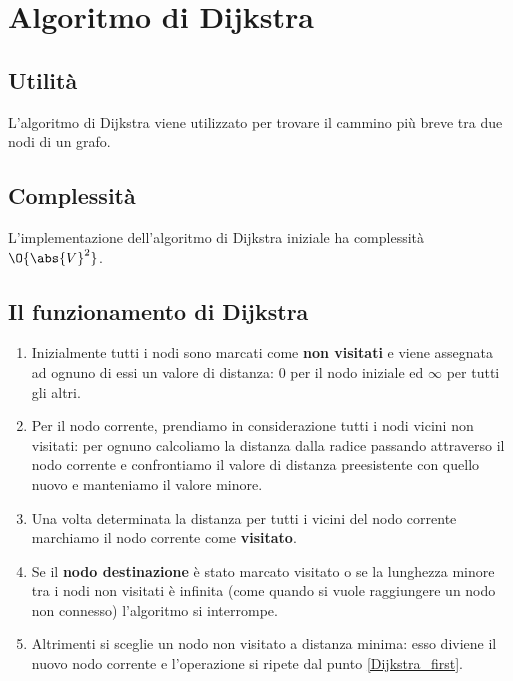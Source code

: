 \documentclass[\main/main.tex]{subfiles}
\begin{document}
\chapter{Algoritmo di Dijkstra}
\section{Utilità}
L'algoritmo di Dijkstra viene utilizzato per trovare il cammino più breve tra due nodi di un grafo.
\section{Complessità}
\begin{complexity}
  L'implementazione dell'algoritmo di Dijkstra iniziale ha complessità \(\O{\abs{V}^2}\).
\end{complexity}

\section{Il funzionamento di Dijkstra}
\begin{enumerate}
  \item Inizialmente tutti i nodi sono marcati come \textbf{non visitati} e viene assegnata ad ognuno di essi un valore di distanza: \(0\) per il nodo iniziale ed \(\infty \) per tutti gli altri.
  \item Per il nodo corrente, prendiamo in considerazione tutti i nodi vicini non visitati: per ognuno calcoliamo la distanza dalla radice passando attraverso il nodo corrente e confrontiamo il valore di distanza preesistente con quello nuovo e manteniamo il valore minore.\label{Dijkstra_first}
  \item Una volta determinata la distanza per tutti i vicini del nodo corrente marchiamo il nodo corrente come \textbf{visitato}.
  \item Se il \textbf{nodo destinazione} è stato marcato visitato o se la lunghezza minore tra i nodi non visitati è infinita (come quando si vuole raggiungere un nodo non connesso) l'algoritmo si interrompe.
  \item Altrimenti si sceglie un nodo non visitato a distanza minima: esso diviene il nuovo nodo corrente e l'operazione si ripete dal punto \ref{Dijkstra_first}.
\end{enumerate}
\clearpage
\end{document}
